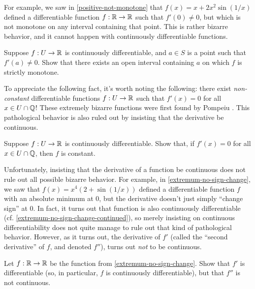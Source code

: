 For example, we saw in \cref{positive-not-monotone} that $f(x) = x + 2x^2\sin(1/x)$ defined a differentiable function $f : \mathbb{R} \to \mathbb{R}$ such that $f'(0) \neq 0$, but which is not monotone on any interval containing that point. This is rather bizarre behavior, and it cannot happen with continuously differentiable functions. 

\begin{exercise} \label{nonzero-derivative-at-point-implies-monotone-in-neighborhood}
	Suppose $f : U \to \mathbb{R}$ is continuously differentiable, and $a \in S$ is a point such that $f'(a) \neq 0$. Show that there exists an open interval containing $a$ on which $f$ is strictly monotone. 
\end{exercise}

To appreciate the following fact, it's worth noting the following: there exist \emph{non-constant} differentiable functions $f : U \to \mathbb{R}$ such that $f'(x) = 0$ for all $x \in U \cap \mathbb{Q}$! These extremely bizarre functions were first found by Pompeiu \cite{pompeiu}. This pathological behavior is also ruled out by insisting that the derivative be continuous. 

\begin{exercise} \label{critical-dense-implies-constant}
	Suppose $f : U \to \mathbb{R}$ is continuously differentiable. Show that, if $f'(x) = 0$ for all $x \in U \cap \mathbb{Q}$, then $f$ is constant. 
\end{exercise}

Unfortunately, insisting that the derivative of a function be continuous does not rule out all possible bizarre behavior. For example, in \cref{extremum-no-sign-change}, we saw that $f(x) = x^4 \left( 2 + \sin(1/x) \right)$ defined a differentiable function $f$ with an absolute minimum at 0, but the derivative doesn't just simply ``change sign'' at 0. In fact, it turns out that function is also continuously differentiable (cf. \cref{extremum-no-sign-change-continued}), so merely insisting on continuous differentiability does not quite manage to rule out that kind of pathological behavior. However, as it turns out, the derivative of $f'$ (called the ``second derivative'' of $f$, and denoted $f''$), turns out \emph{not} to be continuous. 

\begin{exercise} \label{extremum-no-sign-change-continued}
	Let $f : \mathbb{R} \to \mathbb{R}$ be the function from \cref{extremum-no-sign-change}. Show that $f'$ is differentiable (so, in particular, $f$ is continuously differentiable), but that $f''$ is not continuous. 
\end{exercise}

